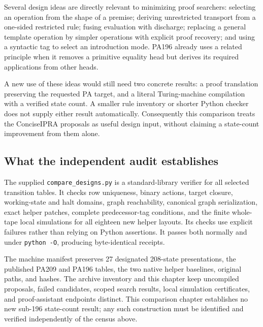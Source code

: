 Several design ideas are directly relevant to minimizing proof searchers:
selecting an operation from the shape of a premise; deriving unrestricted
transport from a one-sided restricted rule; fusing evaluation with discharge;
replacing a general template operation by simpler operations with explicit
proof recovery; and using a syntactic tag to select an introduction mode.
PA196 already uses a related principle when it removes a primitive equality
head but derives its required applications from other heads.

A new use of these ideas would still need two concrete results: a proof
translation preserving the requested PA target, and a literal Turing-machine
compilation with a verified state count.  A smaller rule inventory or shorter
Python checker does not supply either result automatically.  Consequently
this comparison treats the ConciseIPRA proposals as useful design input,
without claiming a state-count improvement from them alone.

\subsection{What the independent audit establishes}
The supplied \texttt{compare\_designs.py} is a standard-library verifier for
all selected transition tables.  It checks row uniqueness, binary actions,
target closure, working-state and halt domains, graph reachability, canonical
graph serialization, exact helper patches, complete predecessor-tag
conditions, and the finite whole-tape local simulations for all eighteen
new helper layouts.  Its checks use explicit failures rather than relying on
Python assertions.  It passes both normally and under \texttt{python -O},
producing byte-identical receipts.

The machine manifest preserves 27 designated 208-state presentations, the
published PA209 and PA196 tables, the two native helper baselines, original
paths, and hashes.  The archive inventory and this chapter keep uncompiled
proposals, failed candidates, scoped search results, local simulation
certificates, and proof-assistant endpoints distinct.  This comparison
chapter establishes no new sub-196 state-count result; any such construction
must be identified and verified independently of the census above.
